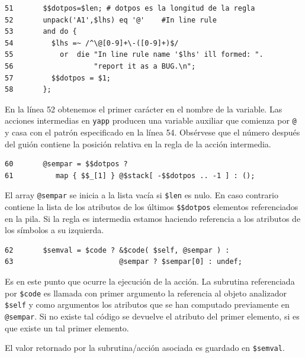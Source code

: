 \begin{verbatim}
51       $$dotpos=$len; # dotpos es la longitud de la regla
52       unpack('A1',$lhs) eq '@'    #In line rule
53       and do {
54         $lhs =~ /^\@[0-9]+\-([0-9]+)$/
55           or  die "In line rule name '$lhs' ill formed: ".
56                   "report it as a BUG.\n";
57         $$dotpos = $1;
58       };
\end{verbatim}
En la línea 52 obtenemos el primer carácter en el nombre de la variable.
Las acciones intermedias en \verb|yapp| producen una variable
auxiliar que comienza por \verb|@| y casa con el patrón
especificado en la línea 54. Obsérvese que el número después
del guión contiene la posición relativa en la regla 
de la acción intermedia.
\begin{verbatim}
60       @sempar = $$dotpos ?   
61          map { $$_[1] } @$stack[ -$$dotpos .. -1 ] : ();
\end{verbatim}
El array \verb|@sempar| se inicia a la lista vacía 
si \verb|$len| es nulo. En caso contrario
contiene la lista de los atributos de los últimos \verb|$$dotpos|
elementos referenciados en la pila.
Si la regla es intermedia estamos haciendo referencia
a los atributos de los símbolos a su izquierda.
\begin{verbatim}
62       $semval = $code ? &$code( $self, @sempar ) : 
63                         @sempar ? $sempar[0] : undef;
\end{verbatim}
Es en este punto que ocurre la ejecución de la acción.
La subrutina referenciada por \verb|$code| es llamada
con primer argumento la referencia al objeto analizador \verb|$self|
y como argumentos los atributos que se han computado
previamente en \verb|@sempar|. Si no existe tal código se devuelve 
el atributo del primer elemento, si es que existe un tal primer
elemento. 

El valor retornado por la subrutina/acción asociada es guardado en 
\verb|$semval|.

